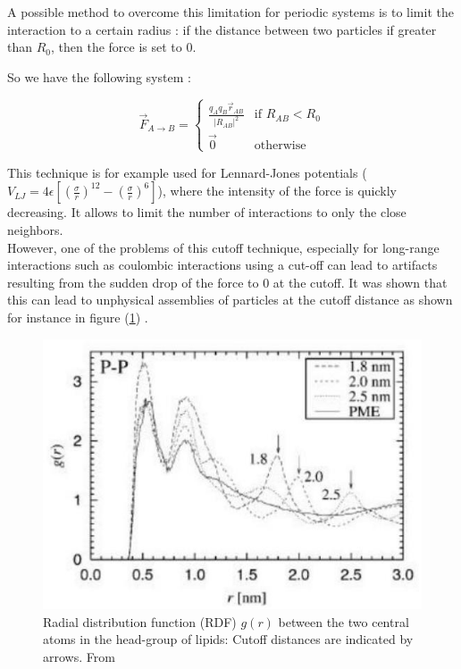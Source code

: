 \documentclass[10pt,twoside,a4paper]{report}
\begin{document}
A possible method to overcome this limitation for periodic systems is to limit the interaction to a certain radius : if the distance between two particles if greater than $R_0$, then the force is set to $0$.

So we have the following system :


\begin{equation}
  \overrightarrow{F}_{A \rightarrow B}  =
	\begin{cases}
	  \frac{q_A q_B \vec{r}_{AB} }{|R_{AB}|^2}  & \text{if } R_{AB} < R_0 \\
	  \overrightarrow{0} & \text{otherwise}
	\end{cases}
\end{equation}

This technique is for example used for Lennard-Jones potentials ($V_{LJ} = 4\epsilon [(\frac{\sigma}{r})^12 - (\frac{\sigma}{r})^6] $), where the intensity of the force is quickly decreasing. It allows to limit the number of interactions to only the close neighbors.\\

However, one of the problems of this cutoff technique, especially for long-range interactions such as coulombic interactions using a cut-off can lead to artifacts resulting from the sudden drop of the force to 0 at the cutoff. It was shown that this can lead to unphysical assemblies of particles at the cutoff distance as shown for instance in figure (\ref{fig:artefact}) .

\begin{figure}[H]

\includegraphics[scale=0.8]{artefact}
 \centering
 
\caption{Radial distribution function (RDF) $g(r)$ between the two
central atoms in the head-group of lipids: Cutoff distances are indicated by arrows. From \cite{patra2003molecular}  }

\label{fig:artefact}

\end{figure}
\end{document}
